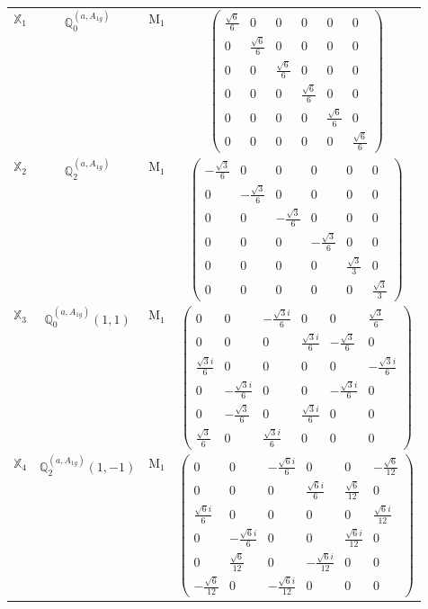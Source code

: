 \documentclass[fleqn,10pt,landscape]{article}
\begin{document}
\begin{itemize}
\begin{center}
\begin{longtable}{c|c|c|c}
$ \mathbb{X}_{1} $ & $\mathbb{Q}_{0}^{(a,A_{1g})}$ & M$_{1}$ & $\begin{pmatrix} \frac{\sqrt{6}}{6} & 0 & 0 & 0 & 0 & 0 \\ 0 & \frac{\sqrt{6}}{6} & 0 & 0 & 0 & 0 \\ 0 & 0 & \frac{\sqrt{6}}{6} & 0 & 0 & 0 \\ 0 & 0 & 0 & \frac{\sqrt{6}}{6} & 0 & 0 \\ 0 & 0 & 0 & 0 & \frac{\sqrt{6}}{6} & 0 \\ 0 & 0 & 0 & 0 & 0 & \frac{\sqrt{6}}{6} \end{pmatrix}$ \\
$ \mathbb{X}_{2} $ & $\mathbb{Q}_{2}^{(a,A_{1g})}$ & M$_{1}$ & $\begin{pmatrix} - \frac{\sqrt{3}}{6} & 0 & 0 & 0 & 0 & 0 \\ 0 & - \frac{\sqrt{3}}{6} & 0 & 0 & 0 & 0 \\ 0 & 0 & - \frac{\sqrt{3}}{6} & 0 & 0 & 0 \\ 0 & 0 & 0 & - \frac{\sqrt{3}}{6} & 0 & 0 \\ 0 & 0 & 0 & 0 & \frac{\sqrt{3}}{3} & 0 \\ 0 & 0 & 0 & 0 & 0 & \frac{\sqrt{3}}{3} \end{pmatrix}$ \\
$ \mathbb{X}_{3} $ & $\mathbb{Q}_{0}^{(a,A_{1g})}(1,1)$ & M$_{1}$ & $\begin{pmatrix} 0 & 0 & - \frac{\sqrt{3} i}{6} & 0 & 0 & \frac{\sqrt{3}}{6} \\ 0 & 0 & 0 & \frac{\sqrt{3} i}{6} & - \frac{\sqrt{3}}{6} & 0 \\ \frac{\sqrt{3} i}{6} & 0 & 0 & 0 & 0 & - \frac{\sqrt{3} i}{6} \\ 0 & - \frac{\sqrt{3} i}{6} & 0 & 0 & - \frac{\sqrt{3} i}{6} & 0 \\ 0 & - \frac{\sqrt{3}}{6} & 0 & \frac{\sqrt{3} i}{6} & 0 & 0 \\ \frac{\sqrt{3}}{6} & 0 & \frac{\sqrt{3} i}{6} & 0 & 0 & 0 \end{pmatrix}$ \\
$ \mathbb{X}_{4} $ & $\mathbb{Q}_{2}^{(a,A_{1g})}(1,-1)$ & M$_{1}$ & $\begin{pmatrix} 0 & 0 & - \frac{\sqrt{6} i}{6} & 0 & 0 & - \frac{\sqrt{6}}{12} \\ 0 & 0 & 0 & \frac{\sqrt{6} i}{6} & \frac{\sqrt{6}}{12} & 0 \\ \frac{\sqrt{6} i}{6} & 0 & 0 & 0 & 0 & \frac{\sqrt{6} i}{12} \\ 0 & - \frac{\sqrt{6} i}{6} & 0 & 0 & \frac{\sqrt{6} i}{12} & 0 \\ 0 & \frac{\sqrt{6}}{12} & 0 & - \frac{\sqrt{6} i}{12} & 0 & 0 \\ - \frac{\sqrt{6}}{12} & 0 & - \frac{\sqrt{6} i}{12} & 0 & 0 & 0 \end{pmatrix}$ \\

\end{longtable}
\end{center}
\end{itemize}
\end{document}
